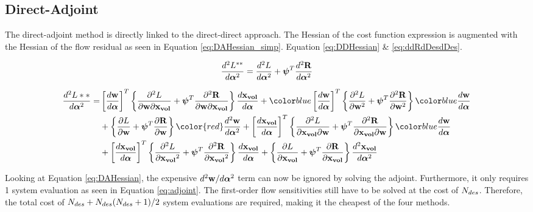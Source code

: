 \documentclass[letterpaper,12pt,]{article}
\begin{document}
\newpage
\subsection*{Direct-Adjoint}

The direct-adjoint method is directly linked to the direct-direct approach.
The Hessian of the cost function expression is augmented with the Hessian of the flow residual as seen in Equation \ref{eq:DAHessian_simp}.
Equation \ref{eq:DDHessian} \& \ref{eq:ddRdDesdDes}.

\begin{equation}
\begin{split}
	\dfrac{d^2L^{**}}{d\boldsymbol{\alpha}^2} 
	=
	\dfrac{d^2L}{d\boldsymbol{\alpha}^2} 
	+
	\boldsymbol{\psi}^T
	\dfrac{d^2\mathbf{R}}{d\boldsymbol{\alpha}^2} 
\label{eq:DAHessian_simp}
\end{split}
\end{equation}

\begin{equation}
\begin{split}
	\DDt{L**}{\balfa} 
	=&
	\trans{\Dt{\bw}{\balfa}}
	\left\{
		\ddelm{L}{\bw}{\xvol}
		+
		\bpsi^T
		\ddelm{\bR}{\bw}{\xvol}
	\right\}
	\Dt{\xvol}{\balfa}
	+
	\blue{\trans{\Dt{\bw}{\balfa}}}
	\left\{
		\ddel{L}{\bw}
		+
		\bpsi^T
		\ddel{\bR}{\bw}
	\right\}
	\blue{\Dt{\bw}{\balfa}}
	\\&+
	\left\{
		\del{L}{\bw}
		+
		\bpsi^T
		\del{\bR}{\bw}
	\right\}
	{\color{red}\DDt{\bw}{\balfa}}
	+
	\trans{\Dt{\xvol}{\balfa}}
	\left\{
		\ddelm{L}{\xvol}{\bw}
		+
		\bpsi^T
		\ddelm{\bR}{\xvol}{\bw}
	\right\}
	\blue{\Dt{\bw}{\balfa}}
	\\&+
	\trans{\Dt{\xvol}{\balfa}}
	\left\{
		\ddel{L}{\xvol}
		+
		\bpsi^T
		\ddel{\bR}{\xvol}
	\right\}
	\Dt{\xvol}{\balfa}
	+
	\left\{
		\del{L}{\xvol}
		+
		\bpsi^T
		\del{\bR}{\xvol}
	\right\}
	\DDt{\xvol}{\balfa}
\label{eq:DAHessian}
\end{split}
\end{equation}

Looking at Equation \ref{eq:DAHessian}, the expensive $d^2\mathbf{w}/d\boldsymbol{\alpha}^2$ term can now be ignored by solving the adjoint.
Furthermore, it only requires 1 system evaluation as seen in Equation \ref{eq:adjoint}.
The first-order flow sensitivities still have to be solved at the cost of $N_{des}$.
Therefore, the total cost of $N_{des} + N_{des}(N_{des}+1)/2$ system evaluations are required, making it the cheapest of the four methods.
\end{document}
